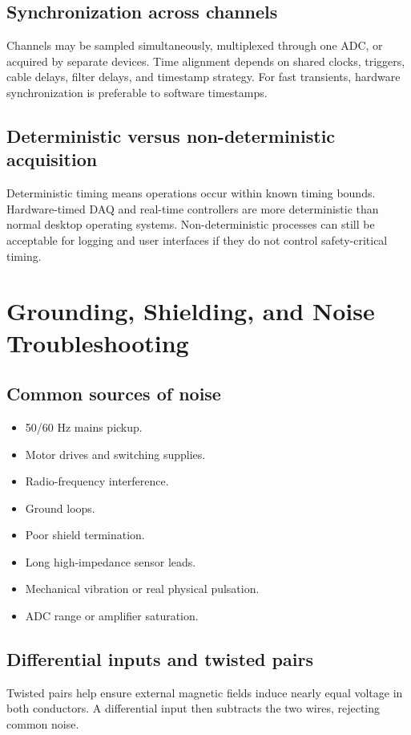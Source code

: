 \documentclass[11pt]{article}
\begin{document}
\subsection{Synchronization across channels}
Channels may be sampled simultaneously, multiplexed through one ADC, or acquired
by separate devices. Time alignment depends on shared clocks, triggers, cable
delays, filter delays, and timestamp strategy. For fast transients, hardware
synchronization is preferable to software timestamps.

\subsection{Deterministic versus non-deterministic acquisition}
Deterministic timing means operations occur within known timing bounds.
Hardware-timed DAQ and real-time controllers are more deterministic than normal
desktop operating systems. Non-deterministic processes can still be acceptable
for logging and user interfaces if they do not control safety-critical timing.

\section{Grounding, Shielding, and Noise Troubleshooting}

\subsection{Common sources of noise}
\begin{itemize}
  \item 50/60 Hz mains pickup.
  \item Motor drives and switching supplies.
  \item Radio-frequency interference.
  \item Ground loops.
  \item Poor shield termination.
  \item Long high-impedance sensor leads.
  \item Mechanical vibration or real physical pulsation.
  \item ADC range or amplifier saturation.
\end{itemize}

\subsection{Differential inputs and twisted pairs}
Twisted pairs help ensure external magnetic fields induce nearly equal voltage in
both conductors. A differential input then subtracts the two wires, rejecting
common noise.
\end{document}
